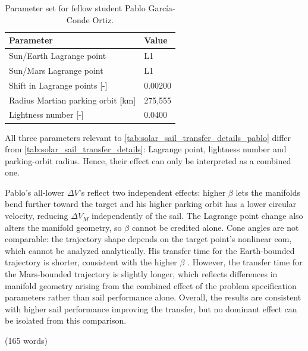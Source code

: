 \begin{table}[H]
  \centering
  \caption{Parameter set for fellow student Pablo García-Conde Ortiz.}
  \label{tab:wp4_parameters_pablo}
  \begin{tabular}{l l}
      \toprule
      \textbf{Parameter} & \textbf{Value} \\
      \midrule
      Sun/Earth Lagrange point            & L1 \\
      Sun/Mars Lagrange point             & L1 \\
      Shift in Lagrange points {[-]}      & 0.00200 \\
      Radius Martian parking orbit {[km]} & 275{,}555 \\
      Lightness number {[-]}              & 0.0400 \\
      \bottomrule
  \end{tabular}
\end{table}

All three parameters relevant to \autoref{tab:solar_sail_transfer_details_pablo} differ from \autoref{tab:solar_sail_transfer_details}: Lagrange point, lightness number and parking-orbit radius.
Hence, their effect can only be interpreted as a combined one. 

Pablo's all-lower $\Delta V$'s reflect two independent effects: higher $\beta$ lets the manifolds bend further toward the target and his higher parking orbit has a lower circular velocity, reducing $\Delta V_M$ independently of the sail. 
The Lagrange point change also alters the manifold geometry, so $\beta$ cannot be credited alone. 
Cone angles are not comparable: the trajectory shape depends on the target point's nonlinear \ac{eom}, which cannot be analyzed analytically.
His transfer time for the Earth-bounded trajectory is shorter, consistent with the higher $\beta$ \parencite{vergaaij2018timeoptimal}.
However, the transfer time for the Mars-bounded trajectory is slightly longer, which reflects differences in manifold geometry arising from the combined effect of the problem specification parameters rather than sail performance alone.
Overall, the results are consistent with higher sail performance improving the transfer, but no dominant effect can be isolated from this comparison.

(165 words)

